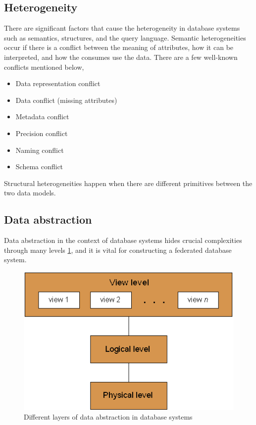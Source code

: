 	\subsection{Heterogeneity}
	There are significant factors that cause the heterogeneity in database systems such as semantics, structures, and the query language. 
	Semantic heterogeneities occur if there is a conflict between the meaning of attributes, how it can be interpreted, and how the consumes use the data. There are a few well-known conflicts mentioned below,
	\begin{itemize}
		\item Data representation conflict
		\item Data conflict (missing attributes)
		\item Metadata conflict
		\item Precision conflict
		\item Naming conflict
		\item Schema conflict
	\end{itemize}
	
	Structural heterogeneities happen when there are different primitives between the two data models.
	
	\subsection{Data abstraction}
	Data abstraction in the context of database systems hides crucial complexities through many levels \ref{fig:Data_abstraction_levels}, and it is vital for constructing a federated database system.
	
	\begin{figure}[!htbp] 
		\begin{center}
			\includegraphics[scale=0.9]{./images/Data_abstraction_levels}	
			\caption{Different layers of data abstraction in database systems \cite{misc12}}	
			\label{fig:Data_abstraction_levels}	
		\end{center}
	\end{figure}
	
